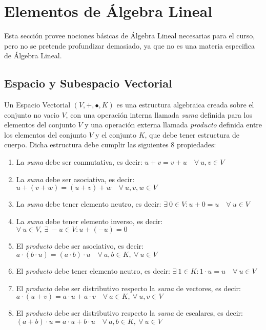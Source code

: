\section{Elementos de Álgebra Lineal}

Esta sección provee nociones básicas de Álgebra Lineal necesarias para el curso,
pero no se pretende profundizar demasiado, ya que no es una materia especifica de Álgebra Lineal.

\subsection{Espacio y Subespacio Vectorial}
\begin{defi}
	Un Espacio Vectorial $(V, +, \bullet , K)$ es una estructura algebraica creada sobre
	el conjunto no vacio $V$, con una operación interna llamada \textit{suma} definida
	para los elementos del conjunto $V$ y una operación externa llamada \textit{producto} definida
	entre los elementos del conjunto $V$ y el conjunto $K$, que debe tener estructura
	de cuerpo. Dicha estructura debe cumplir las siguientes 8 propiedades:
	\begin{enumerate}
		\item La \textit{suma} debe ser conmutativa, es decir: $ u + v = v + u \quad \forall\ u,v \in V$
		\item La \textit{suma} debe ser asociativa, es decir: $ u + (v + w) = (u + v) + w \quad \forall\ u,v,w \in V$
		\item La \textit{suma} debe tener elemento neutro, es decir: $\exists\ 0 \in V : u + 0 = u \quad \forall\ u \in V$
		\item La \textit{suma} debe tener elemento inverso, es decir: $\forall\ u \in V,\ \exists\ -u \in V : u + (-u) = 0$
		\item El \textit{producto} debe ser asociativo, es decir: $ a \cdot (b \cdot u) = (a \cdot b) \cdot u \quad \forall\ a,b \in K,\ \forall\ u \in V$
		\item El \textit{producto} debe tener elemento neutro, es decir: $\exists\ 1 \in K : 1 \cdot u = u \quad \forall\ u \in V$
		\item El \textit{producto} debe ser distributivo respecto la \textit{suma} de vectores, es decir: $ a \cdot (u + v) = a \cdot u + a \cdot v \quad \forall\ a \in K,\ \forall\ u,v \in V$
		\item El \textit{producto} debe ser distributivo respecto la \textit{suma} de escalares, es decir: $ (a + b) \cdot u = a \cdot u + b \cdot u \quad \forall\ a,b \in K,\ \forall\ u \in V$
	\end{enumerate}
\end{defi}

